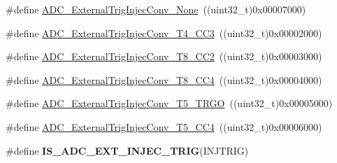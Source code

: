 \begin{DoxyCompactItemize}
\item 
\#define \hyperlink{group__ADC__external__trigger__sources__for__injected__channels__conversion_gaad11a68fca76d97b97dc2554dac5cb16}{ADC\_\-ExternalTrigInjecConv\_\-None}~((uint32\_\-t)0x00007000)
\item 
\#define \hyperlink{group__ADC__external__trigger__sources__for__injected__channels__conversion_gae342ca48595f0b2bf866943969026581}{ADC\_\-ExternalTrigInjecConv\_\-T4\_\-CC3}~((uint32\_\-t)0x00002000)
\item 
\#define \hyperlink{group__ADC__external__trigger__sources__for__injected__channels__conversion_gac0320df9aa5e2d378b05f8e4dcc1616a}{ADC\_\-ExternalTrigInjecConv\_\-T8\_\-CC2}~((uint32\_\-t)0x00003000)
\item 
\#define \hyperlink{group__ADC__external__trigger__sources__for__injected__channels__conversion_ga6724679fe75f87c029f268ef47841a3e}{ADC\_\-ExternalTrigInjecConv\_\-T8\_\-CC4}~((uint32\_\-t)0x00004000)
\item 
\#define \hyperlink{group__ADC__external__trigger__sources__for__injected__channels__conversion_ga1d92236e9eb9f3adf69371f3f698192e}{ADC\_\-ExternalTrigInjecConv\_\-T5\_\-TRGO}~((uint32\_\-t)0x00005000)
\item 
\#define \hyperlink{group__ADC__external__trigger__sources__for__injected__channels__conversion_gade68a960ba05714e5f0a1f11a086884e}{ADC\_\-ExternalTrigInjecConv\_\-T5\_\-CC4}~((uint32\_\-t)0x00006000)
\item 
\#define {\bfseries IS\_\-ADC\_\-EXT\_\-INJEC\_\-TRIG}(INJTRIG)
\end{DoxyCompactItemize}


